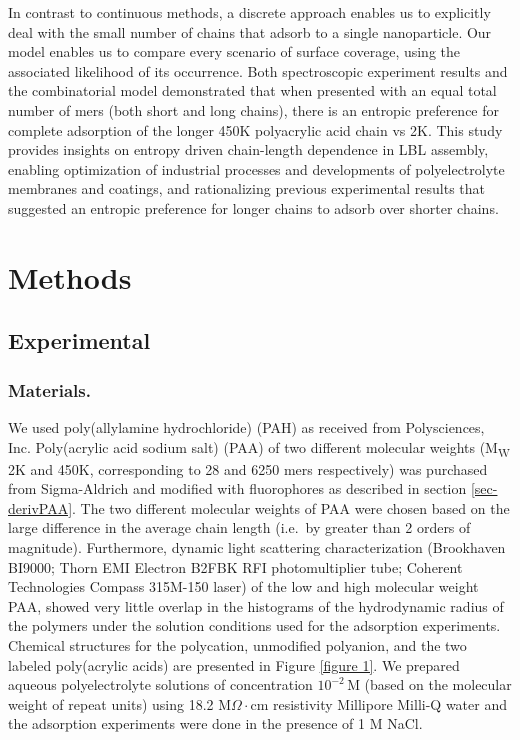\documentclass[twoside,twocolumn,9pt]{article}
\begin{document}
In contrast to continuous methods\cite{Shojaei2017},
a discrete approach enables us to explicitly deal with the small number of chains that adsorb to a single nanoparticle.
Our model enables us to compare every scenario of surface coverage, using the associated likelihood of its occurrence. 
Both spectroscopic experiment results and the combinatorial model demonstrated that when presented with an equal total number of mers (both short and long chains),
there is an entropic preference for complete adsorption of the longer 450K polyacrylic acid chain vs 2K. This study provides insights on entropy driven chain-length dependence in LBL assembly, enabling optimization of industrial processes and developments of polyelectrolyte membranes and coatings, and rationalizing previous experimental results that suggested an entropic preference for longer chains to adsorb over shorter chains.

\section{Methods}     %
     \label{sec-methods}
     
\subsection{Experimental}  %
    \label{sec-meth-exp}

\subsubsection{Materials.}     %
       \label{sec-materials}

We used poly(allylamine hydrochloride) (PAH) as received from Polysciences, Inc.  Poly(acrylic acid sodium salt) (PAA) of two different molecular weights (M\textsubscript{W} 2K and 450K, corresponding to 28 and
6250 mers respectively) was purchased from Sigma-Aldrich and modified with fluorophores as described in section \ref{sec-derivPAA}. 
The two different molecular weights of PAA were chosen based on the large difference in the average chain length (i.e.\ by greater than 2 orders of magnitude).  Furthermore, dynamic light scattering characterization (Brookhaven BI9000; Thorn EMI Electron B2FBK RFI photomultiplier tube; Coherent Technologies Compass 315M-150 laser) of the low and high molecular weight PAA, showed very little overlap in the histograms of the hydrodynamic radius of the polymers under the solution conditions used for the adsorption experiments.  Chemical structures for the polycation, unmodified polyanion, 
and the two labeled poly(acrylic acids) are presented in Figure \ref{figure 1}.  We prepared aqueous polyelectrolyte solutions of concentration $10^{-2}\,$M (based on the molecular weight of repeat units) using 18.2 M$\Omega\cdot$cm resistivity Millipore Milli-Q water and the adsorption experiments were done in the presence of 1 M NaCl.
\end{document}
